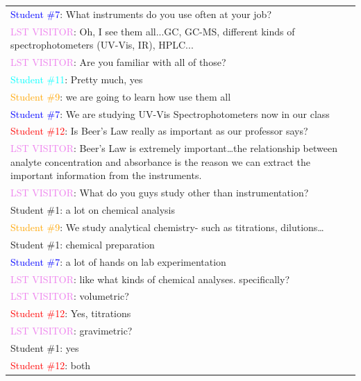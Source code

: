 \documentclass[11.5pt]{sig-alternate} %
\begin{document}
\begin{large}
\begin{table}[htbp]
\begin{tabular}{|l|}
\hline
\textcolor{blue}{Student \#7}: What instruments do you use often at your job? \\
\textcolor{violet}{LST VISITOR}: Oh, I see them all...GC, GC-MS, different kinds of spectrophotometers (UV-Vis, IR), HPLC... \\
\textcolor{violet}{LST VISITOR}: Are you familiar with all of those? \\
\textcolor{cyan}{Student \#11}: Pretty much, yes \\
\textcolor{orange}{Student \#9}: we are going to learn how use them all \\
\textcolor{blue}{Student \#7}: We are studying UV-Vis Spectrophotometers now in our class \\
\textcolor{red}{Student \#12}: Is Beer’s Law really as important as our professor says? \\
\textcolor{violet}{LST VISITOR}: Beer’s Law is extremely important…the relationship between analyte concentration and absorbance is the reason we can extract the important information from the instruments.\\
\textcolor{violet}{LST VISITOR}: What do you guys study other than instrumentation? \\
\textcolor{green7}{Student \#1}: a lot on chemical analysis \\
\textcolor{orange}{Student \#9}: We study analytical chemistry- such as titrations, dilutions… \\
\textcolor{green7}{Student \#1}: chemical preparation \\
\textcolor{blue}{Student \#7}: a lot of hands on lab experimentation \\
\textcolor{violet}{LST VISITOR}: like what kinds of chemical analyses. specifically? \\
\textcolor{violet}{LST VISITOR}: volumetric? \\
\textcolor{red}{Student \#12}: Yes, titrations \\
\textcolor{violet}{LST VISITOR}: gravimetric? \\
\textcolor{green7}{Student \#1}: yes \\
\textcolor{red}{Student \#12}: both \\ \hline
\end{tabular}
\end{table}


\end{large}
\end{document}
